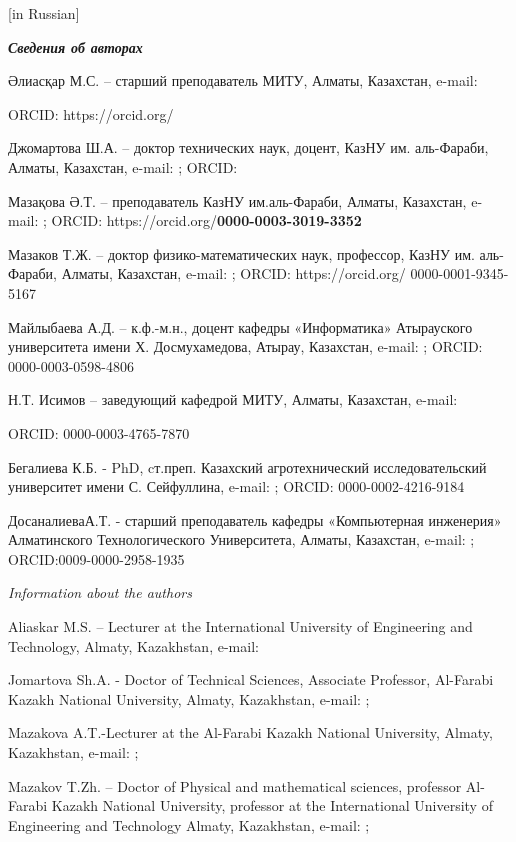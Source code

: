 {[}in Russian{]}

\emph{{\bfseries Сведения об авторах}}

Әлиасқар М.С. -- старший преподаватель МИТУ, Алматы, Казахстан, e-mail:

ORCID:
https://orcid.org/\href{https://orcid.org/0000-0002-3013-6617}{}

Джомартова Ш.А. -- доктор технических наук, доцент, КазНУ им.
аль-Фараби, Алматы, Казахстан, e-mail:
\href{mailto:jomartova@mail.ru}{}; ORCID:
\href{https://orcid.org/0000-0002-5882-5588}{}

Мазақова Ә.Т. -- преподаватель КазНУ им.аль-Фараби, Алматы, Казахстан,
e-mail: \href{mailto:aigerym97@mail.ru}{}; ORCID:
https://orcid.org/{\bfseries 0000-0003-3019-3352}

Мазаков Т.Ж. -- доктор физико-математических наук, профессор, КазНУ им.
аль-Фараби, Алматы, Казахстан, e-mail:
\href{mailto:tmazakov@mail.ru}{}; ORCID:
https://orcid.org/ 0000-0001-9345-5167

Майлыбаева А.Д. -- к.ф.-м.н., доцент кафедры «Информатика» Атырауского
университета имени Х. Досмухамедова, Атырау, Казахстан, e-mail:
\href{mailto:a.maylibayeva@asu.edu.kz}{};
ORCID: 0000-0003-0598-4806

Н.Т. Исимов -- заведующий кафедрой МИТУ, Алматы, Казахстан, e-mail:

ORCID: 0000-0003-4765-7870

Бегалиева К.Б. - PhD, cт.преп. Казахский агротехнический
исследовательский университет имени С. Сейфуллина, e-mail:
\href{mailto:kalamkas_b@mail.ru}{};
ORCID: 0000-0002-4216-9184

ДосаналиеваА.Т. - старший преподаватель кафедры «Компьютерная инженерия»
Алматинского Технологического Университета, Алматы, Казахстан, e-mail:
\href{mailto:Dosanalieva1985@gmail.com}{};
ORCID:0009-0000-2958-1935

\emph{Information about the authors}

Aliaskar M.S. -- Lecturer at the International University of Engineering
and Technology, Almaty, Kazakhstan, e-mail:


Jomartova Sh.A. - Doctor of Technical Sciences, Associate Professor,
Al-Farabi Kazakh National University, Almaty, Kazakhstan, e-mail:
\href{mailto:jomartova@mail.ru}{};

Mazakova A.T.-Lecturer at the Al-Farabi Kazakh National University,
Almaty, Kazakhstan, e-mail:
\href{mailto:aigerym97@mail.ru}{};

Mazakov T.Zh. -- Doctor of Physical and mathematical sciences, professor
Al-Farabi Kazakh National University, professor at the International
University of Engineering and Technology Almaty, Kazakhstan, e-mail:
\href{mailto:tmazakov@mail.ru}{};

